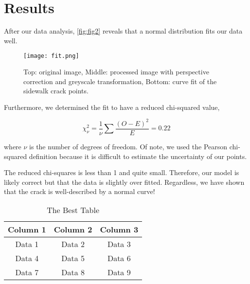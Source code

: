 \documentclass{article}
\begin{document}
\section{Results}

After our data analysis, \autoref{fig:fig2} reveals that a normal distribution fits our data well.
\begin{figure}[ht]
    \centering
    \texttt{[image: fit.png]}
    \caption{Top: original image, Middle: processed image with perspective correction and greyscale transformation, Bottom: curve fit of the sidewalk crack points.}
    \label{fig:fig2}
\end{figure}

Furthermore, we determined the fit to have a reduced chi-squared value,

$$
\chi^2_\nu = \frac{1}{\nu} \sum \frac{(O - E)^2}{E} = 0.22
$$

where \( \nu \) is the number of degrees of freedom. Of note, we used the Pearson chi-squared definition because it is difficult to estimate the uncertainty of our points.

The reduced chi-squares is less than 1 and quite small. Therefore, our model is likely correct but that the
data is slightly over fitted. Regardless, we have shown that the crack is well-described by a normal curve!




\cite{2020NumPy-Array, 2020SciPy-NMeth} 


\begin{table}[ht]
    \centering
    \caption{The Best Table}
    \begin{tabular}{|c|c|c|}
        \hline
        Column 1 & Column 2 & Column 3 \\
        \hline
        Data 1 & Data 2 & Data 3 \\
        Data 4 & Data 5 & Data 6 \\
        Data 7 & Data 8 & Data 9 \\
        \hline
    \end{tabular}
\end{table}
\end{document}
